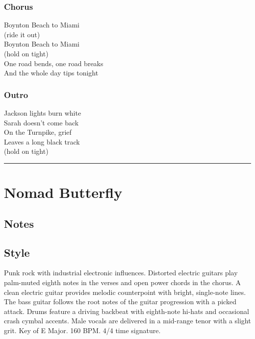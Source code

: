 \documentclass[]{article}
\begin{document}
\subsubsection{Chorus}\label{chorus-33}

Boynton Beach to Miami\\
(ride it out)\\
Boynton Beach to Miami\\
(hold on tight)\\
One road bends, one road breaks\\
And the whole day tips tonight

\subsubsection{Outro}\label{outro-5}

Jackson lights burn white\\
Sarah doesn't come back\\
On the Turnpike, grief\\
Leaves a long black track\\
(hold on tight)

\begin{center}\rule{0.5\linewidth}{0.5pt}\end{center}

\section{Nomad Butterfly}\label{nomad-butterfly}

\subsection{Notes}\label{notes-21}

\subsection{Style}\label{style-21}

Punk rock with industrial electronic influences. Distorted electric
guitars play palm-muted eighth notes in the verses and open power chords
in the chorus. A clean electric guitar provides melodic counterpoint
with bright, single-note lines. The bass guitar follows the root notes
of the guitar progression with a picked attack. Drums feature a driving
backbeat with eighth-note hi-hats and occasional crash cymbal accents.
Male vocals are delivered in a mid-range tenor with a slight grit. Key
of E Major. 160 BPM. 4/4 time signature.
\end{document}
